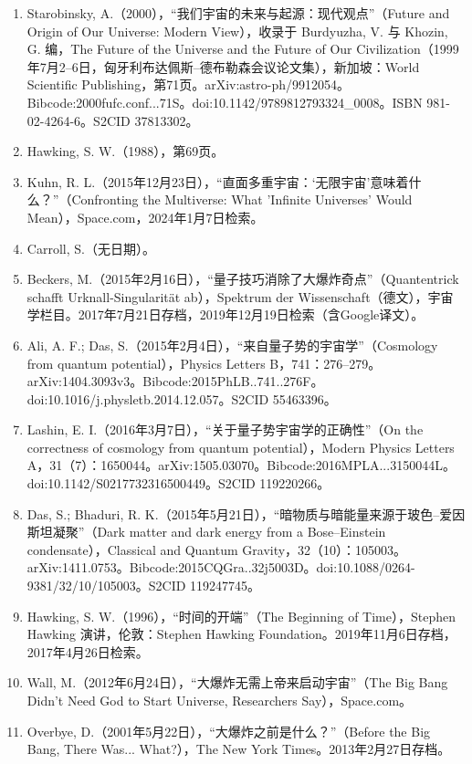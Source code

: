 \begin{enumerate}
\item Starobinsky, A.（2000），“我们宇宙的未来与起源：现代观点”（Future and Origin of Our Universe: Modern View），收录于 Burdyuzha, V. 与 Khozin, G. 编，The Future of the Universe and the Future of Our Civilization（1999年7月2–6日，匈牙利布达佩斯–德布勒森会议论文集），新加坡：World Scientific Publishing，第71页。arXiv:astro-ph/9912054。Bibcode:2000fufc.conf...71S。doi:10.1142/9789812793324_0008。ISBN 981-02-4264-6。S2CID 37813302。  
\item Hawking, S. W.（1988），第69页。  
\item Kuhn, R. L.（2015年12月23日），“直面多重宇宙：‘无限宇宙’意味着什么？”（Confronting the Multiverse: What 'Infinite Universes' Would Mean），Space.com，2024年1月7日检索。  
\item Carroll, S.（无日期）。  
\item Beckers, M.（2015年2月16日），“量子技巧消除了大爆炸奇点”（Quantentrick schafft Urknall-Singularität ab），Spektrum der Wissenschaft（德文），宇宙学栏目。2017年7月21日存档，2019年12月19日检索（含Google译文）。  
\item Ali, A. F.; Das, S.（2015年2月4日），“来自量子势的宇宙学”（Cosmology from quantum potential），Physics Letters B，741：276–279。arXiv:1404.3093v3。Bibcode:2015PhLB..741..276F。doi:10.1016/j.physletb.2014.12.057。S2CID 55463396。  
\item Lashin, E. I.（2016年3月7日），“关于量子势宇宙学的正确性”（On the correctness of cosmology from quantum potential），Modern Physics Letters A，31（7）：1650044。arXiv:1505.03070。Bibcode:2016MPLA...3150044L。doi:10.1142/S0217732316500449。S2CID 119220266。  
\item Das, S.; Bhaduri, R. K.（2015年5月21日），“暗物质与暗能量来源于玻色–爱因斯坦凝聚”（Dark matter and dark energy from a Bose–Einstein condensate），Classical and Quantum Gravity，32（10）：105003。arXiv:1411.0753。Bibcode:2015CQGra..32j5003D。doi:10.1088/0264-9381/32/10/105003。S2CID 119247745。  
\item Hawking, S. W.（1996），“时间的开端”（The Beginning of Time），Stephen Hawking 演讲，伦敦：Stephen Hawking Foundation。2019年11月6日存档，2017年4月26日检索。  
\item Wall, M.（2012年6月24日），“大爆炸无需上帝来启动宇宙”（The Big Bang Didn't Need God to Start Universe, Researchers Say），Space.com。  
\item Overbye, D.（2001年5月22日），“大爆炸之前是什么？”（Before the Big Bang, There Was... What?），The New York Times。2013年2月27日存档。  

\end{enumerate}
